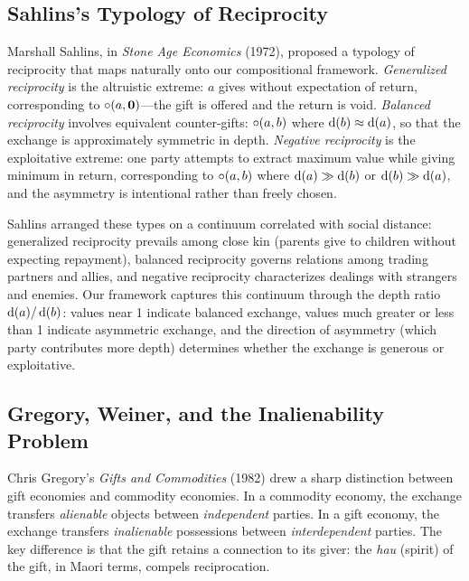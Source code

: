 \subsection*{Sahlins's Typology of Reciprocity}

Marshall Sahlins, in \textit{Stone Age Economics} (1972), proposed a
typology of reciprocity that maps naturally onto our compositional
framework.  \emph{Generalized reciprocity} is the altruistic extreme:
$a$ gives without expectation of return, corresponding to
$\circ(a, \mathbf{0})$---the gift is offered and the return is void.
\emph{Balanced reciprocity} involves equivalent counter-gifts:
$\circ(a, b)$ where $\operatorname{d}(b) \approx \operatorname{d}(a)$, so that the
exchange is approximately symmetric in depth.  \emph{Negative
reciprocity} is the exploitative extreme: one party attempts to extract
maximum value while giving minimum in return, corresponding to
$\circ(a, b)$ where $\operatorname{d}(a) \gg \operatorname{d}(b)$ or $\operatorname{d}(b) \gg
\operatorname{d}(a)$, and the asymmetry is intentional rather than freely chosen.

Sahlins arranged these types on a continuum correlated with social
distance: generalized reciprocity prevails among close kin (parents
give to children without expecting repayment), balanced reciprocity
governs relations among trading partners and allies, and negative
reciprocity characterizes dealings with strangers and enemies.  Our
framework captures this continuum through the depth ratio
$\operatorname{d}(a)/\operatorname{d}(b)$: values near 1 indicate balanced exchange,
values much greater or less than 1 indicate asymmetric exchange, and
the direction of asymmetry (which party contributes more depth)
determines whether the exchange is generous or exploitative.

\subsection*{Gregory, Weiner, and the Inalienability Problem}

Chris Gregory's \textit{Gifts and Commodities} (1982) drew a sharp
distinction between gift economies and commodity economies.  In a
commodity economy, the exchange transfers \emph{alienable} objects
between \emph{independent} parties.  In a gift economy, the exchange
transfers \emph{inalienable} possessions between \emph{interdependent}
parties.  The key difference is that the gift retains a connection to
its giver: the \textit{hau} (spirit) of the gift, in Maori terms,
compels reciprocation.

